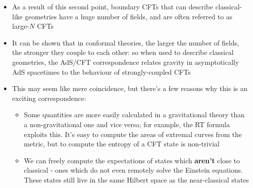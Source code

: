 \documentclass[12pt,a4paper]{article}
\numberwithin{equation}{section}
\begin{document}
\begin{itemize}
		\item As a result of this second point, boundary CFTs that can describe classical-like geometries have a huge number of fields, and are often referred to as large-$N$ CFTs
		\item It can be shown that in conformal theories, the larger the number of fields, the stronger they couple to each other: so when used to describe classical geometries, the AdS/CFT correspondence relates gravity in asymptotically AdS spacetimes to the behaviour of strongly-coupled CFTs
		\item This may seem like mere coincidence, but there's a few reasons why this is an exciting correspondence:
		\begin{itemize}
			\item Some quantities are more easily calculated in a gravitational theory than a non-gravitational one and vice versa; for example, the RT formula exploits this. It's easy to compute the areas of extremal curves from the metric, but to compute the entropy of a CFT state is non-trivial
			\item We can freely compute the expectations of states which \textbf{aren't} close to classical - ones which do not even remotely solve the Einstein equations. These states still live in the same Hilbert space as the near-classical states
		\end{itemize}
	\end{itemize}
\end{document}
